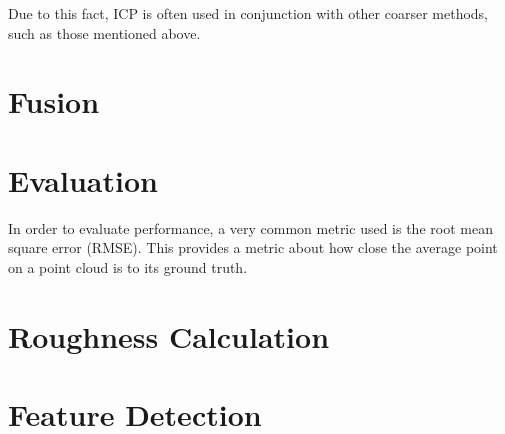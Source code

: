 Due to this fact, ICP is often used in conjunction with other coarser methods, such as those mentioned above.


\section{Fusion}


\section{Evaluation}

In order to evaluate performance, a very common metric used is the root mean square error (RMSE). This provides a metric about how close the average point on a point cloud is to its ground truth. 


\section{Roughness Calculation}

\section{Feature Detection}


